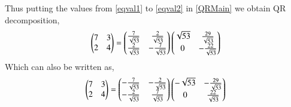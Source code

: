 \documentclass[journal,12pt,twocolumn]{IEEEtran}
\begin{document}
Thus putting the values from \eqref{eqval1} to \eqref{eqval2} in \eqref{QRMain} we obtain QR decomposition,
\begin{align}
    \begin{pmatrix}7 & 3 \\ 2 & 4\end{pmatrix} =\begin{pmatrix}\frac{7}{\sqrt{53}}&\frac{2}{\sqrt{53}}\\\frac{2}{\sqrt{53}}&-\frac{7}{\sqrt{53}}\end{pmatrix}\begin{pmatrix}\sqrt{53}&\frac{29}{\sqrt{53}}\\0&-\frac{22}{\sqrt{53}}\end{pmatrix}
\end{align}
Which can also be written as,
\begin{align}
    \begin{pmatrix}7 & 3 \\ 2 & 4\end{pmatrix} =\begin{pmatrix}-\frac{7}{\sqrt{53}}&-\frac{2}{\sqrt{53}}\\-\frac{2}{\sqrt{53}}&\frac{7}{\sqrt{53}}\end{pmatrix}\begin{pmatrix}-\sqrt{53}&-\frac{29}{\sqrt{53}}\\0&\frac{22}{\sqrt{53}}\end{pmatrix}
\end{align}
\end{document}
